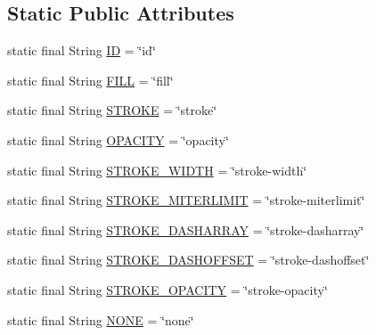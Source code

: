 \subsection*{Static Public Attributes}
\begin{DoxyCompactItemize}
\item 
static final String \mbox{\hyperlink{classorg_1_1newdawn_1_1slick_1_1svg_1_1_non_geometric_data_a3f699c855d9a2180a283ec410dda57ea}{ID}} = \char`\"{}id\char`\"{}
\item 
static final String \mbox{\hyperlink{classorg_1_1newdawn_1_1slick_1_1svg_1_1_non_geometric_data_a100ce60b2b8dec195850716cbf3aa500}{F\+I\+LL}} = \char`\"{}fill\char`\"{}
\item 
static final String \mbox{\hyperlink{classorg_1_1newdawn_1_1slick_1_1svg_1_1_non_geometric_data_a2e4170b7a30903a3789bae566a1604e4}{S\+T\+R\+O\+KE}} = \char`\"{}stroke\char`\"{}
\item 
static final String \mbox{\hyperlink{classorg_1_1newdawn_1_1slick_1_1svg_1_1_non_geometric_data_aa346daf50205f575a71994c28744d1d5}{O\+P\+A\+C\+I\+TY}} = \char`\"{}opacity\char`\"{}
\item 
static final String \mbox{\hyperlink{classorg_1_1newdawn_1_1slick_1_1svg_1_1_non_geometric_data_abe7b202a653bece82879b8108bc608bd}{S\+T\+R\+O\+K\+E\+\_\+\+W\+I\+D\+TH}} = \char`\"{}stroke-\/width\char`\"{}
\item 
static final String \mbox{\hyperlink{classorg_1_1newdawn_1_1slick_1_1svg_1_1_non_geometric_data_ac2f315f5dce4ec7d367105e0211776d5}{S\+T\+R\+O\+K\+E\+\_\+\+M\+I\+T\+E\+R\+L\+I\+M\+IT}} = \char`\"{}stroke-\/miterlimit\char`\"{}
\item 
static final String \mbox{\hyperlink{classorg_1_1newdawn_1_1slick_1_1svg_1_1_non_geometric_data_a64ec4437b422a0496f04e1b1dfb57dbf}{S\+T\+R\+O\+K\+E\+\_\+\+D\+A\+S\+H\+A\+R\+R\+AY}} = \char`\"{}stroke-\/dasharray\char`\"{}
\item 
static final String \mbox{\hyperlink{classorg_1_1newdawn_1_1slick_1_1svg_1_1_non_geometric_data_a70f8c97ab9dda4e75b436c0f198a296e}{S\+T\+R\+O\+K\+E\+\_\+\+D\+A\+S\+H\+O\+F\+F\+S\+ET}} = \char`\"{}stroke-\/dashoffset\char`\"{}
\item 
static final String \mbox{\hyperlink{classorg_1_1newdawn_1_1slick_1_1svg_1_1_non_geometric_data_a5afeda15ca92e26fb0016871030ec9f6}{S\+T\+R\+O\+K\+E\+\_\+\+O\+P\+A\+C\+I\+TY}} = \char`\"{}stroke-\/opacity\char`\"{}
\item 
static final String \mbox{\hyperlink{classorg_1_1newdawn_1_1slick_1_1svg_1_1_non_geometric_data_a1b7889bd7fd378ea138023d10e1e8319}{N\+O\+NE}} = \char`\"{}none\char`\"{}
\end{DoxyCompactItemize}
